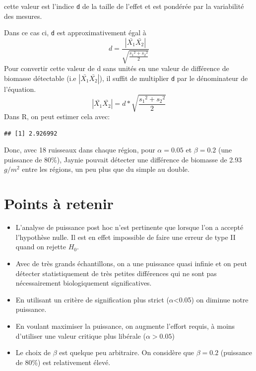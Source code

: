 \documentclass[12pt,]{book}
\makeatletter
\newenvironment{Shaded}{\begin{snugshade}}{\end{snugshade}}
\newcommand{\DataTypeTok}[1]{\textcolor[rgb]{0.13,0.29,0.53}{#1}}
\newcommand{\DecValTok}[1]{\textcolor[rgb]{0.00,0.00,0.81}{#1}}
\newcommand{\FloatTok}[1]{\textcolor[rgb]{0.00,0.00,0.81}{#1}}
\newcommand{\KeywordTok}[1]{\textcolor[rgb]{0.13,0.29,0.53}{\textbf{#1}}}
\newcommand{\NormalTok}[1]{#1}
\newcommand{\OperatorTok}[1]{\textcolor[rgb]{0.81,0.36,0.00}{\textbf{#1}}}
\newcommand{\StringTok}[1]{\textcolor[rgb]{0.31,0.60,0.02}{#1}}
\providecommand{\tightlist}{%
  \setlength{\itemsep}{0pt}\setlength{\parskip}{0pt}}
\newenvironment{kframe}{%
\medskip{}
\setlength{\fboxsep}{.8em}
\def\at@end@of@kframe{}%
\ifinner\ifhmode%
 \def\at@end@of@kframe{\end{minipage}}%
 \begin{minipage}{\columnwidth}%
\fi\fi%
\def\FrameCommand##1{\hskip\@totalleftmargin \hskip-\fboxsep
\colorbox{incolor}{##1}\hskip-\fboxsep
    \hskip-\linewidth \hskip-\@totalleftmargin \hskip\columnwidth}%
\MakeFramed {\advance\hsize-\width
  \@totalleftmargin\z@ \linewidth\hsize
  \@setminipage}}%
{\par\unskip\endMakeFramed%
\at@end@of@kframe}
\newenvironment{rmdblock}[1]
 {
 \begin{itemize}
 \renewcommand{\labelitemi}{
   \raisebox{-.7\height}[0pt][0pt]{
     {\setkeys{Gin}{width=3em,keepaspectratio}\texttt{[image: images/\#1]}}
   }
 }
 \begin{kframe}
 \setlength{\fboxsep}{1em}
 \item
 }
 {
 \end{kframe}
 \end{itemize}
 }
\newenvironment{rmdcaution}
  {\begin{rmdblock}{caution}}
  {\end{rmdblock}}
\makeatother
\begin{document}
\begin{rmdcaution}
cette valeur est l'indice \texttt{d} de la taille de l'effet et est pondérée par la variabilité des mesures.
\end{rmdcaution}

Dans ce cas ci, \texttt{d} est approximativement égal à
\[ d = \frac{| \bar{X_1} \bar{X_2} |} {\sqrt{\frac{{s_1}^2 +{s_2}^2}{2}}}\]
Pour convertir cette valeur de d sans unités en une valeur de différence de biomasse détectable (i.e \(| \bar{X_1} \bar{X_2} |\)), il suffit de multiplier \texttt{d} par le dénominateur de l'équation.
\[
| \bar{X_1} \bar{X_2} | = d * \sqrt{\frac{{s_1}^2 +{s_2}^2}{2}}
\]
Dans R, on peut estimer cela avec:

\begin{Shaded}
\end{Shaded}

\begin{verbatim}
## [1] 2.926992
\end{verbatim}

Donc, avec 18 ruisseaux dans chaque région, pour \(\alpha=0.05\) et \(\beta=0.2\) (une puissance de 80\%), Jaynie pouvait détecter une différence de biomasse de 2.93\(g/m^2\) entre les régions, un peu plus que du simple au double.

\hypertarget{points-uxe0-retenir}{%
\section{Points à retenir}\label{points-uxe0-retenir}}

\begin{itemize}
\tightlist
\item
  L'analyse de puissance post hoc n'est pertinente que lorsque l'on a accepté l'hypothèse nulle.
  Il est en effet impossible de faire une erreur de type II quand on rejette \(H_0\).
\item
  Avec de très grands échantillons, on a une puissance quasi infinie et on peut détecter statistiquement de très petites différences qui ne sont pas nécessairement biologiquement significatives.
\item
  En utilisant un critère de signification plus strict (\(\alpha\)\textless{}0.05) on diminue notre puissance.
\item
  En voulant maximiser la puissance, on augmente l'effort requis, à moins d'utiliser une valeur critique plus libérale (\(\alpha>0.05\))
\item
  Le choix de \(\beta\) est quelque peu arbitraire.
  On considère que \(\beta=0.2\) (puissance de 80\%) est relativement élevé.
\end{itemize}
\end{document}
